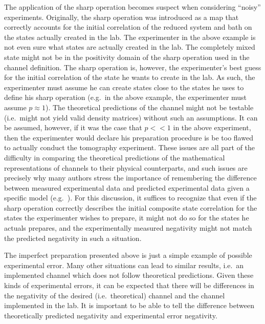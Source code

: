 The application of the sharp operation becomes suspect when considering ``noisy'' experiments.  Originally, the sharp operation was introduced as a map that correctly accounts for the initial correlation of the reduced system and bath on the states actually created in the lab.  The experimenter in the above example is not even sure what states are actually created in the lab.  The completely mixed state might not be in the positivity domain of the sharp operation used in the channel definition.  The sharp operation is, however, the experimenter's best guess for the initial correlation of the state he wants to create in the lab.  As such, the experimenter must assume he can create states close to the states he uses to define his sharp operation (e.g.\ in the above example, the experimenter must assume $p \approx 1$).  The theoretical predictions of the channel might not be testable (i.e.\ might not yield valid density matrices) without such an assumptions.  It can be assumed, however, if it was the case that $p<< 1$ in the above experiment, then the experimenter would declare his preparation procedure is be too flawed to actually conduct the tomography experiment.  These issues are all part of the difficulty in comparing the theoretical predictions of the mathematical representations of channels to their physical counterparts, and such issues are precisely why many authors stress the importance of remembering the difference between measured experimental data and predicted experimental data given a specific model (e.g.\ \cite{Sudarshen2007}).  For this discussion, it suffices to recognize that even if the sharp operation correctly describes the initial composite state correlation for the states the experimenter wishes to prepare, it might not do so for the states he actuals prepares, and the experimentally measured negativity might not match the predicted negativity in such a situation.

The imperfect preparation presented above is just a simple example of possible experimental error.  Many other situations can lead to similar results, i.e.\ an implemented channel which does not follow theoretical predictions.  Given these kinds of experimental errors, it can be expected that there will be differences in the negativity of the desired (i.e.\ theoretical) channel and the channel implemented in the lab.  It is important to be able to tell the difference between theoretically predicted negativity and experimental error negativity.  

